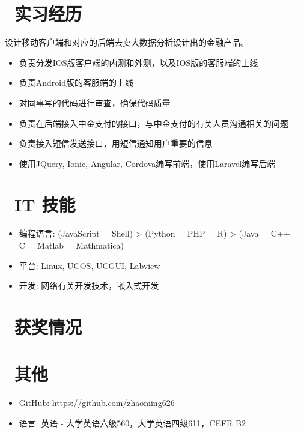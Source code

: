 \documentclass{resume}
\begin{document}
\section{\faUsers\ 实习经历}
设计移动客户端和对应的后端去卖大数据分析设计出的金融产品。
\begin{itemize}
  \item 负责分发IOS版客户端的内测和外测，以及IOS版的客服端的上线
  \item 负责Android版的客服端的上线
  \item 对同事写的代码进行审查，确保代码质量
  \item 负责在后端接入中金支付的接口，与中金支付的有关人员沟通相关的问题
  \item 负责接入短信发送接口，用短信通知用户重要的信息
  \item 使用JQuery, Ionic, Angular, Cordova编写前端，使用Laravel编写后端
\end{itemize}

\section{\faCogs\ IT 技能}
\begin{itemize}[parsep=0.5ex]
  \item 编程语言: (JavaScript = Shell) > (Python = PHP = R) > (Java = C++ = C = Matlab =
Mathmatica)
  \item 平台: Linux, UCOS, UCGUI, Labview
  \item 开发: 网络有关开发技术，嵌入式开发
\end{itemize}

\section{\faHeartO\ 获奖情况}

\section{\faInfo\ 其他}
\begin{itemize}[parsep=0.5ex]
  \item GitHub: https://github.com/zhaoming626
  \item 语言: 英语 - 大学英语六级560，大学英语四级611，CEFR B2
\end{itemize}

%
%
\end{document}
